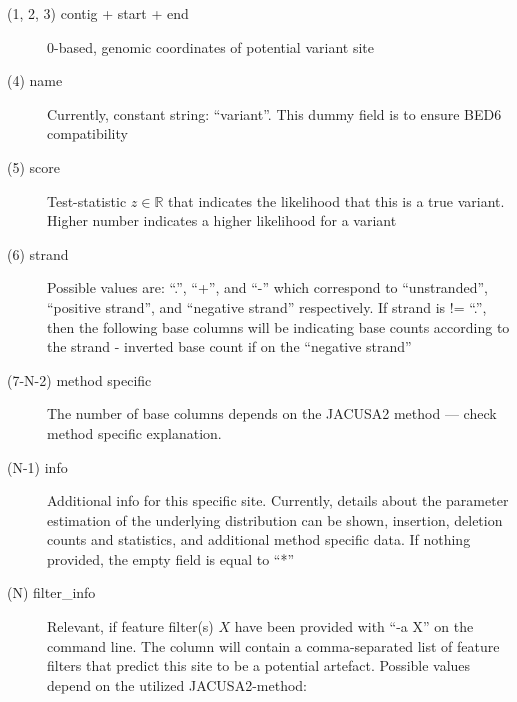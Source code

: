 \documentclass[10pt,a4paper]{article}
\begin{document}
\begin{description}
\item[(1, 2, 3) contig + start + end] 0-based, genomic coordinates of potential variant site
\item[(4) name] Currently, constant string: ``variant''. This dummy field is to ensure BED6
compatibility
\item[(5) score] Test-statistic $z \in \mathbb{R}$ that indicates the likelihood that this is a true
variant. Higher number indicates a higher likelihood for a variant
\item[(6) strand] Possible values are: ``.'', ``+'', and ``-'' which correspond to ``unstranded'',
``positive strand'', and ``negative strand'' respectively. If strand is != ``.'', then the following base columns
will be indicating base counts according to the strand - inverted base count if on the ``negative
strand''
\item[(7-N-2) method specific] The number of base columns depends on the JACUSA2 method --- check method specific explanation.
\item[(N-1) info] Additional info for this specific site. Currently, details about the parameter
estimation of the underlying distribution can be shown, insertion, deletion counts and statistics,  
and additional method specific data. If nothing provided, the empty field is equal to ``*''
\item[(N) filter\_info] Relevant, if feature filter(s) $X$ have been provided with ``-a X'' on the
command line. The column will contain a comma-separated list of feature filters that predict this
site to be a potential artefact. Possible values depend on the utilized JACUSA2-method: \\ 


\end{description}
\end{document}
